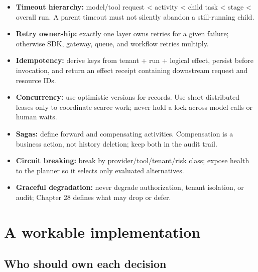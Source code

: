\begin{itemize}

\item \textbf{Timeout hierarchy:} model/tool request < activity < child task < stage < overall run. A parent timeout must not silently abandon a still-running child.

\item \textbf{Retry ownership:} exactly one layer owns retries for a given failure; otherwise SDK, gateway, queue, and workflow retries multiply.

\item \textbf{Idempotency:} derive keys from tenant + run + logical effect, persist before invocation, and return an effect receipt containing downstream request and resource IDs.

\item \textbf{Concurrency:} use optimistic versions for records. Use short distributed leases only to coordinate scarce work; never hold a lock across model calls or human waits.

\item \textbf{Sagas:} define forward and compensating activities. Compensation is a business action, not history deletion; keep both in the audit trail.

\item \textbf{Circuit breaking:} break by provider/tool/tenant/risk class; expose health to the planner so it selects only evaluated alternatives.

\item \textbf{Graceful degradation:} never degrade authorization, tenant isolation, or audit; Chapter 28 defines what may drop or defer.

\end{itemize}

\section{A workable implementation}

\subsection{Who should own each decision}

